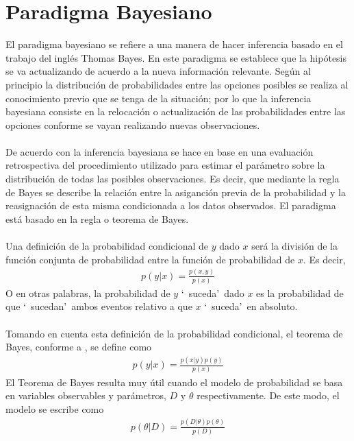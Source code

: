 \chapter{Paradigma Bayesiano}
El paradigma bayesiano se refiere a una manera de hacer inferencia basado en el trabajo del ingl\'es Thomas Bayes. En este paradigma se establece que la hip\'otesis se va actualizando de acuerdo a la nueva informaci\'on  relevante. Seg\'un \cite{kruschke2014doing} al principio la distribuci\'on de probabilidades entre las opciones posibles se realiza al conocimiento previo que se tenga de la situaci\'on; por lo que la inferencia bayesiana consiste en la relocaci\'on o actualizaci\'on de las probabilidades entre las opciones conforme se vayan realizando nuevas observaciones.\\
\\
De acuerdo con \cite{gelman2014bayesian} la inferencia bayesiana se hace en base en una evaluaci\'on retrospectiva del procedimiento utilizado para estimar el par\'ametro sobre la distribuci\'on de todas las posibles observaciones. Es decir, que mediante la regla de Bayes se describe la relaci\'on entre la asiganci\'on previa de la probabilidad y la reasignaci\'on de esta misma condicionada a los datos observados. El paradigma est\'a basado en la regla o teorema de Bayes.\\
\\
Una definici\'on de la probabilidad condicional de $y$ dado $x$  ser\'a la divisi\'on de la funci\'on conjunta de probabilidad entre la funci\'on de probabilidad de $x$. Es decir,
\begin{align*}
p(y|x)=\frac{p(x,y)}{p(x)}
\end{align*}
O en otras palabras, la probabilidad de $y$ `\ suceda'\ dado $x$ es la probabilidad de que `\ sucedan'\ ambos eventos relativo a que $x$ `\ suceda'\ en absoluto.\\
\\
Tomando en cuenta esta definici\'on de la probabilidad condicional, el teorema de Bayes, conforme a \cite{kruschke2014doing}, se define como
\begin{align*}
p(y|x)=\frac{p(x|y)p(y)}{p(x)}
\end{align*}
El Teorema de Bayes resulta muy \'util cuando el modelo de probabilidad se basa en variables observables y  par\'ametros, $D$ y $\theta$ respectivamente. De este modo, el modelo se escribe como
\begin{align*}
p(\theta|D)=\frac{p(D|\theta)p(\theta)}{p(D)}
\end{align*}
